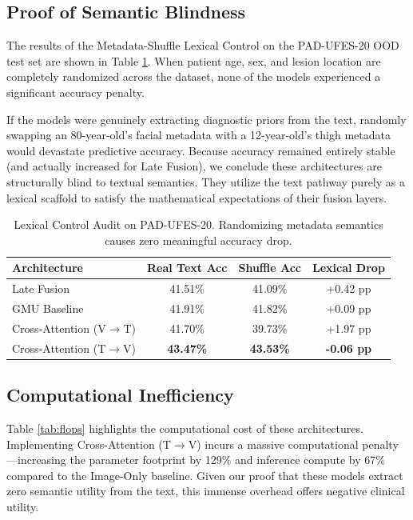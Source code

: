 \documentclass[runningheads]{llncs}
\begin{document}
\subsection{Proof of Semantic Blindness}
The results of the Metadata-Shuffle Lexical Control on the PAD-UFES-20 OOD test set are shown in Table \ref{tab:lexical}. When patient age, sex, and lesion location are completely randomized across the dataset, none of the models experienced a significant accuracy penalty. 

If the models were genuinely extracting diagnostic priors from the text, randomly swapping an 80-year-old's facial metadata with a 12-year-old's thigh metadata would devastate predictive accuracy. Because accuracy remained entirely stable (and actually increased for Late Fusion), we conclude these architectures are structurally blind to textual semantics. They utilize the text pathway purely as a lexical scaffold to satisfy the mathematical expectations of their fusion layers.

\begin{table}[h]
\centering
\caption{Lexical Control Audit on PAD-UFES-20. Randomizing metadata semantics causes zero meaningful accuracy drop.}
\label{tab:lexical}
\begin{tabular}{lccc}
\toprule
Architecture & Real Text Acc & Shuffle Acc & Lexical Drop \\
\midrule
Late Fusion & 41.51\% & 41.09\% & +0.42 pp \\
GMU Baseline & 41.91\% & 41.82\% & +0.09 pp \\
Cross-Attention (V$\rightarrow$T) & 41.70\% & 39.73\% & +1.97 pp \\
Cross-Attention (T$\rightarrow$V) & \textbf{43.47\%} & \textbf{43.53\%} & \textbf{-0.06 pp} \\
\bottomrule
\end{tabular}
\end{table}

\subsection{Computational Inefficiency}
Table \ref{tab:flops} highlights the computational cost of these architectures. Implementing Cross-Attention (T$\rightarrow$V) incurs a massive computational penalty—increasing the parameter footprint by 129\% and inference compute by 67\% compared to the Image-Only baseline. Given our proof that these models extract zero semantic utility from the text, this immense overhead offers negative clinical utility.
\end{document}
